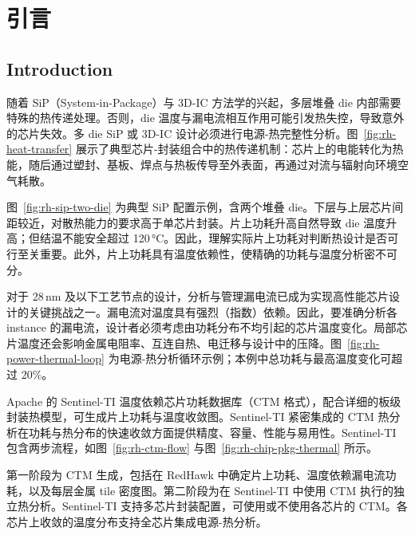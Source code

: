 ﻿%
\label{chap:thermal}

\section{引言}
\subsection*{Introduction}

随着 SiP（System-in-Package）与 3D-IC 方法学的兴起，多层堆叠 die 内部需要特殊的热传递处理。否则，die 温度与漏电流相互作用可能引发热失控，导致意外的芯片失效。多 die SiP 或 3D-IC 设计必须进行电源-热完整性分析。图~\ref{fig:rh-heat-transfer} 展示了典型芯片-封装组合中的热传递机制：芯片上的电能转化为热能，随后通过塑封、基板、焊点与热板传导至外表面，再通过对流与辐射向环境空气耗散。

\label{fig:rh-heat-transfer}

图~\ref{fig:rh-sip-two-die} 为典型 SiP 配置示例，含两个堆叠 die。下层与上层芯片间距较近，对散热能力的要求高于单芯片封装。片上功耗升高自然导致 die 温度升高；但结温不能安全超过 120\,°C。因此，理解实际片上功耗对判断热设计是否可行至关重要。此外，片上功耗具有温度依赖性，使精确的功耗与温度分析密不可分。

\label{fig:rh-sip-two-die}

对于 28\,nm 及以下工艺节点的设计，分析与管理漏电流已成为实现高性能芯片设计的关键挑战之一。漏电流对温度具有强烈（指数）依赖。因此，要准确分析各 instance 的漏电流，设计者必须考虑由功耗分布不均引起的芯片温度变化。局部芯片温度还会影响金属电阻率、互连自热、电迁移与设计中的压降。图~\ref{fig:rh-power-thermal-loop} 为电源-热分析循环示例；本例中总功耗与最高温度变化可超过 20\%。

\label{fig:rh-power-thermal-loop}

Apache 的 Sentinel-TI 温度依赖芯片功耗数据库（CTM 格式），配合详细的板级封装热模型，可生成片上功耗与温度收敛图。Sentinel-TI 紧密集成的 CTM 热分析在功耗与热分布的快速收敛方面提供精度、容量、性能与易用性。Sentinel-TI 包含两步流程，如图~\ref{fig:rh-ctm-flow} 与图~\ref{fig:rh-chip-pkg-thermal} 所示。

第一阶段为 CTM 生成，包括在 RedHawk 中确定片上功耗、温度依赖漏电流功耗，以及每层金属 tile 密度图。第二阶段为在 Sentinel-TI 中使用 CTM 执行的独立热分析。Sentinel-TI 支持多芯片封装配置，可使用或不使用各芯片的 CTM。各芯片上收敛的温度分布支持全芯片集成电源-热分析。

